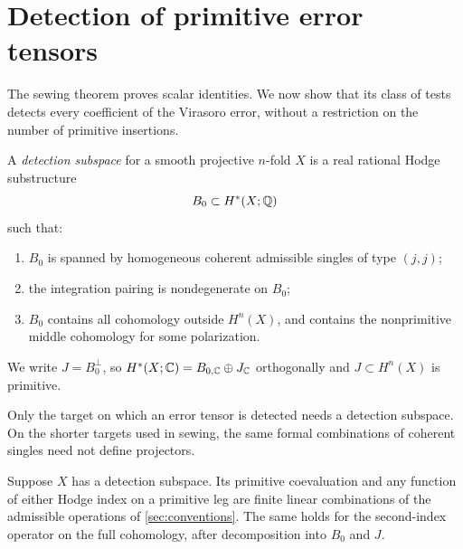 \section{Detection of primitive error tensors}\label{sec:detection}

The sewing theorem proves scalar identities. We now show that its class of tests detects every coefficient of the Virasoro error, without a restriction on the number of primitive insertions.

\begin{definition}\label{det:setup}
A \emph{detection subspace} for a smooth projective \(n\)-fold \(X\) is a real rational Hodge substructure
\[
 B_0\subset H^*(X;\mathbb Q)
\]
such that:
\begin{enumerate}[label=\textup{(\roman*)}]
\item \(B_0\) is spanned by homogeneous coherent admissible singles of type \((j,j)\);
\item the integration pairing is nondegenerate on \(B_0\);
\item \(B_0\) contains all cohomology outside \(H^n(X)\), and contains the nonprimitive middle cohomology for some polarization.
\end{enumerate}
We write \(J=B_0^\perp\), so \(H^*(X;\mathbb C)=B_{0,\mathbb C}\oplus J_\mathbb C\) orthogonally and \(J\subset H^n(X)\) is primitive.
\end{definition}

Only the target on which an error tensor is detected needs a detection subspace. On the shorter targets used in sewing, the same formal combinations of coherent singles need not define projectors.

\begin{lemma}\label{det:operations}
Suppose \(X\) has a detection subspace. Its primitive coevaluation and any function of either Hodge index on a primitive leg are finite linear combinations of the admissible operations of \cref{sec:conventions}. The same holds for the second-index operator on the full cohomology, after decomposition into \(B_0\) and \(J\).
\end{lemma}

